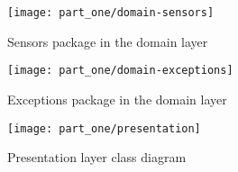 \begin{figure}
\caption{Sensors package in the domain layer}
\centering
\texttt{[image: part\_one/domain-sensors]}
\end{figure}

\begin{figure}
\caption{Exceptions package in the domain layer }
\centering
\texttt{[image: part\_one/domain-exceptions]}
\end{figure}

\begin{figure}
\caption{Presentation layer class diagram}
\centering
\texttt{[image: part\_one/presentation]}
\end{figure}
